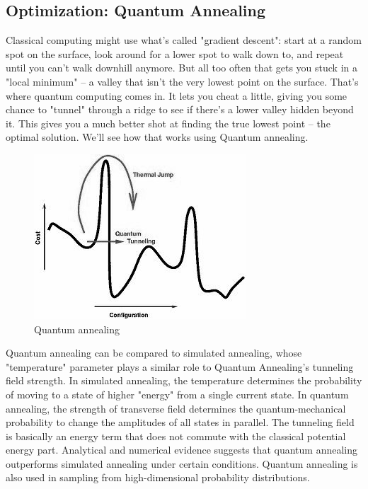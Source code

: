 \subsection{Optimization: Quantum Annealing}
Classical computing might use what's called "gradient descent": start at a random spot on the surface, look around for a lower spot to walk down to, and repeat until you can't walk downhill anymore. But all too often that gets you stuck in a "local minimum" -- a valley that isn't the very lowest point on the surface.
That's where quantum computing comes in. It lets you cheat a little, giving you some chance to "tunnel" through a ridge to see if there's a lower valley hidden beyond it. This gives you a much better shot at finding the true lowest point -- the optimal solution. We'll see how that works using Quantum annealing.\par\bigskip
\begin{figure}[H]
\centering\includegraphics[width=.4\textwidth]{images/anneal.png}
\caption{Quantum annealing}
\end{figure}
Quantum annealing\cite{quananneal} can be compared to simulated annealing, whose "temperature" parameter plays a similar role to Quantum Annealing's tunneling field strength. In simulated annealing, the temperature determines the probability of moving to a state of higher "energy" from a single current state. In quantum annealing, the strength of transverse field determines the quantum-mechanical probability to change the amplitudes of all states in parallel.
The tunneling field is basically an energy term that does not commute with the classical potential energy part. Analytical and numerical evidence suggests that quantum annealing outperforms simulated annealing under certain conditions. Quantum annealing is also used in sampling from high-dimensional probability distributions.
